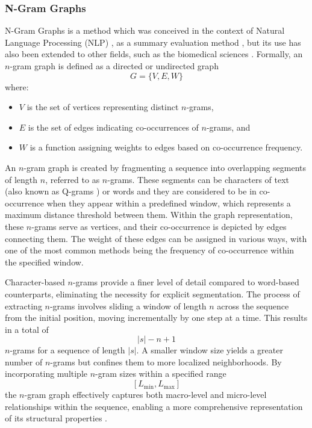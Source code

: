 \documentclass{article}
\begin{document}
\subsubsection{N-Gram Graphs} \label{sec:graphs}

N-Gram Graphs is a method which was conceived in the context of Natural Language Processing (NLP) \cite{giannakopoulos2008, tsekouras2017}, as a summary evaluation method \cite{giannakopoulos2008summarization}, but its use has also been extended to other fields, such as the biomedical sciences \cite{kazantzidis2017, polychronopoulos2014}. Formally, an \( n \)-gram graph is defined as a directed or undirected graph 
\[
G = \{ V, E, W \}
\]
where:
\begin{itemize}
    \item \( V \) is the set of vertices representing distinct \( n \)-grams,
    \item \( E \) is the set of edges indicating co-occurrences of \( n \)-grams, and
    \item \( W \) is a function assigning weights to edges based on co-occurrence frequency.
\end{itemize}

An \( n \)-gram graph is created by fragmenting a sequence into overlapping segments of length \( n \), referred to as \( n \)-grams. These segments can be characters of text (also known as Q-grams \cite{ukkonen1992}) or words and they are considered to be in co-occurrence when they appear within a predefined window, which represents a maximum distance threshold between them. Within the graph representation, these \( n \)-grams serve as vertices, and their co-occurrence is depicted by edges connecting them. The weight of these edges can be assigned in various ways, with one of the most common methods being the frequency of co-occurrence within the specified window.

Character-based \( n \)-grams provide a finer level of detail compared to word-based counterparts, eliminating the necessity for explicit segmentation. The process of extracting \( n \)-grams involves sliding a window of length \( n \) across the sequence from the initial position, moving incrementally by one step at a time. This results in a total of 
\[
|s| - n + 1
\]
\( n \)-grams for a sequence of length \( |s| \). A smaller window size yields a greater number of \( n \)-grams but confines them to more localized neighborhoods. By incorporating multiple \( n \)-gram sizes within a specified range 
\[
[L_{\min}, L_{\max}]
\]
the \( n \)-gram graph effectively captures both macro-level and micro-level relationships within the sequence, enabling a more comprehensive representation of its structural properties \cite{gialitsis2023}.
\end{document}
